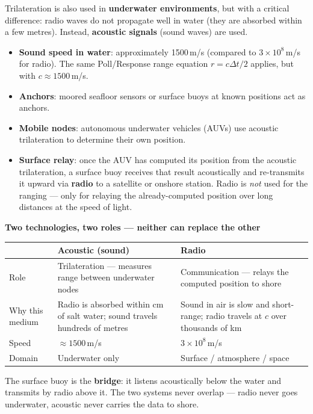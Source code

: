 \documentclass[12pt, a4paper]{article}
\begin{document}
Trilateration is also used in \textbf{underwater environments}, but with
a critical difference: radio waves do not propagate well in water
(they are absorbed within a few metres).
Instead, \textbf{acoustic signals} (sound waves) are used.

\begin{itemize}[leftmargin=1.2em,itemsep=3pt]
  \item \textbf{Sound speed in water}: approximately 1500\,m/s
    (compared to $3\times10^8$\,m/s for radio).
    The same Poll/Response range equation $r = c\Delta t / 2$ applies,
    but with $c \approx 1500$\,m/s.
  \item \textbf{Anchors}: moored seafloor sensors or surface buoys at
    known positions act as anchors.
  \item \textbf{Mobile nodes}: autonomous underwater vehicles (AUVs)
    use acoustic trilateration to determine their own position.
  \item \textbf{Surface relay}: once the AUV has computed its position
    from the acoustic trilateration, a surface buoy receives that result
    acoustically and re-transmits it upward via \textbf{radio} to a
    satellite or onshore station.
    Radio is \emph{not} used for the ranging --- only for relaying the
    already-computed position over long distances at the speed of light.
\end{itemize}

\begin{notebox}
  \textbf{Two technologies, two roles --- neither can replace the other}

  \medskip
  \begin{tabular}{@{} p{2.8cm} p{4.6cm} p{4.6cm} @{}}
    \toprule
    & \textbf{Acoustic (sound)} & \textbf{Radio} \\
    \midrule
    Role & Trilateration --- measures range between underwater nodes &
      Communication --- relays the computed position to shore \\[4pt]
    Why this medium & Radio is absorbed within cm of salt water;
      sound travels hundreds of metres &
      Sound in air is slow and short-range; radio travels at $c$ over
      thousands of km \\[4pt]
    Speed & $\approx 1500$\,m/s & $3\times10^8$\,m/s \\[4pt]
    Domain & Underwater only & Surface / atmosphere / space \\
    \bottomrule
  \end{tabular}

  \medskip
  The surface buoy is the \textbf{bridge}: it listens acoustically
  below the water and transmits by radio above it.
  The two systems never overlap --- radio never goes underwater,
  acoustic never carries the data to shore.
\end{notebox}
\end{document}
